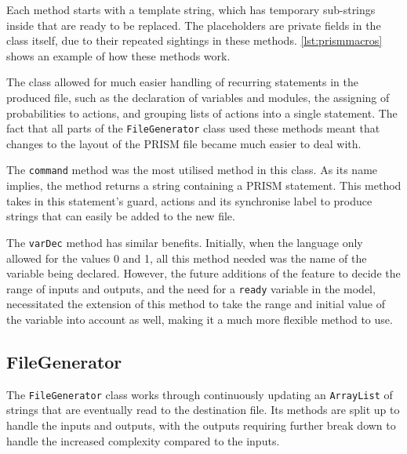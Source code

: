 \documentclass[report.tex]{subfiles}
\begin{document}
Each method starts with a template string, which has temporary sub-strings
inside that are ready to be replaced. The placeholders are private fields in the
class itself, due to their repeated sightings in these methods. 
\ref{lst:prismmacros} shows an example of how these methods work.



The class allowed for much easier handling of recurring statements in the
produced file, such as the declaration of variables and modules, the assigning
of probabilities to actions, and grouping lists of actions into a single
statement. The fact that all parts of the \texttt{FileGenerator} class used
these methods meant that changes to the layout of the PRISM file became much
easier to deal with.

The \texttt{command} method was the most utilised method in this class. As its
name implies, the method returns a string containing a PRISM statement. This
method takes in this statement's guard, actions and its synchronise label to
produce strings that can easily be added to the new file.

The \texttt{varDec} method has similar benefits. Initially, when the language
only allowed for the values 0 and 1, all this method needed was the name of the
variable being declared. However, the future additions of the feature to
decide the range of inputs and outputs, and the need for a \texttt{ready}
variable in the model, necessitated the extension of this method to take the
range and initial value of the variable into account as well, making it a much
more flexible method to use.

\subsection{FileGenerator} %
\label{sub:filegenerator}
The \texttt{FileGenerator} class works through continuously updating an
\texttt{ArrayList} of strings that are eventually read to the destination file.
Its methods are split up to handle the inputs and outputs, with the outputs
requiring further break down to handle the increased complexity compared to the
inputs.


\end{document}
